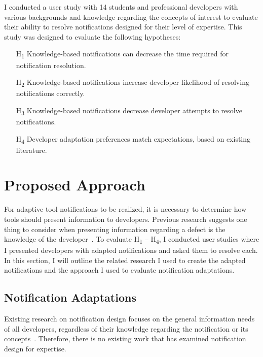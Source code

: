 I conducted a user study with 14 students and professional developers with various backgrounds and knowledge regarding the concepts of interest to evaluate their ability to resolve notifications designed for their level of expertise. This study was designed to evaluate the following hypotheses:
\begin{itemize}
    \item [H\textsubscript{1}] Knowledge-based notifications can decrease the time required for notification resolution.
    \item [H\textsubscript{2}] Knowledge-based notifications increase developer likelihood of resolving notifications correctly. 
    \item [H\textsubscript{3}] Knowledge-based notifications decrease developer attempts to resolve notifications.
    \item [H\textsubscript{4}] Developer adaptation preferences match expectations, based on existing literature.
\end{itemize}


\section{Proposed Approach}

For adaptive tool notifications to be realized, it is necessary to determine how tools should present information to developers. Previous research suggests one thing to consider when presenting information regarding a defect is the knowledge of the developer~\cite{johnson2016cross}.
To evaluate H\textsubscript{1} -- H\textsubscript{4}, I conducted user studies where I presented developers with adapted notifications and asked them to resolve each. In this section, I will outline the related research I used to create the adapted notifications and the approach I used to evaluate notification adaptations.

\subsection{Notification Adaptations}

Existing research on notification design focuses on the general information needs of all developers, regardless of their knowledge regarding the notification or its concepts~\cite{smith2015questions, barik14, robillard2014recommendation}. Therefore, there is no existing work that has examined notification design for expertise. 


